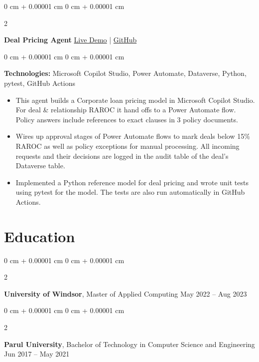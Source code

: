 \documentclass[10pt, letterpaper]{article}
\newenvironment{highlights}{
    \begin{itemize}[
        topsep=0.10 cm,
        parsep=0.10 cm,
        partopsep=0pt,
        itemsep=0pt,
        leftmargin=0 cm + 10pt
    ]
}{
    \end{itemize}
} %
\newenvironment{onecolentry}{
    \begin{adjustwidth}{
        0 cm + 0.00001 cm
    }{
        0 cm + 0.00001 cm
    }
}{
    \end{adjustwidth}
} %
\newenvironment{twocolentry}[2][]{
    \onecolentry
    \def\secondColumn{#2}
    \setcolumnwidth{\fill, 4.5 cm}
    \begin{paracol}{2}
}{
    \switchcolumn \raggedleft \secondColumn
    \end{paracol}
    \endonecolentry
} %
\begin{document}
        \begin{twocolentry}{
            \href{https://deals.inkandinfra.com}{Live Demo} |
            \href{https://github.com/hpk369/northlake-deal-pricing-agent}{GitHub}
        }
            \textbf{Deal Pricing Agent}\end{twocolentry}
        \vspace{0.10 cm}
        \begin{onecolentry}
            \textbf{Technologies:}\> Microsoft Copilot Studio, Power Automate, Dataverse, Python, pytest, GitHub Actions
            \begin{highlights}
                \item This agent builds a Corporate loan pricing model in Microsoft Copilot Studio. For deal \& relationship RAROC it hand offs to a Power Automate flow. Policy answers include references to exact clauses in 3 policy documents.
                \item Wires up approval stages of Power Automate flows to mark deals below 15\% RAROC as well as policy exceptions for manual processing. All incoming requests and their decisions are logged in the audit table of the deal’s Dataverse table.
                \item Implemented a Python reference model for deal pricing and wrote unit tests using pytest for the model. The tests are also run automatically in GitHub Actions.
            \end{highlights}
        \end{onecolentry}

    \section{Education}
        \begin{twocolentry}{
            May 2022 – Aug 2023
        }
            \textbf{University of Windsor}, Master of Applied Computing \end{twocolentry}

        \begin{twocolentry}{
            Jun 2017 – May 2021
        }
            \textbf{Parul University}, Bachelor of Technology in Computer Science and Engineering\end{twocolentry}
\end{document}
